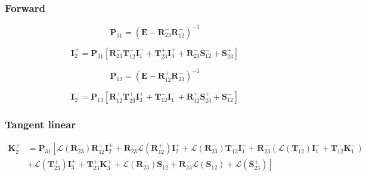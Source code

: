 \subsubsection{Forward}
\label{sec:radiance-internal_radiance-forward}

\begin{equation}
\mathbf{P}_{31} = (\mathbf{E} - \mathbf{R}^{-}_{23}\mathbf{R}^{+}_{12})^{-1}
\label{eq:radiance-internal_radiance-P31}
\end{equation}

\begin{equation}
\mathbf{I}^{+}_{2} = \mathbf{P}_{31} \left[\mathbf{R}^{-}_{23}\mathbf{T}^{-}_{12}\mathbf{I}^{-}_{1} + \mathbf{T}^{+}_{23}\mathbf{I}^{+}_{3} + \mathbf{R}^{-}_{23}\mathbf{S}^{-}_{12} + \mathbf{S}^{+}_{23}\right]
\label{eq:radiance-internal_radiance-I_p_2_0}
\end{equation}

\begin{equation}
\mathbf{P}_{13} = (\mathbf{E} - \mathbf{R}^{+}_{12}\mathbf{R}^{-}_{23})^{-1}
\label{eq:radiance-internal_radiance-P13}
\end{equation}

\begin{equation}
\mathbf{I}^{-}_{2} = \mathbf{P}_{13} \left[\mathbf{R}^{+}_{12}\mathbf{T}^{+}_{23}\mathbf{I}^{+}_{3} + \mathbf{T}^{-}_{12}\mathbf{I}^{-}_{1} + \mathbf{R}^{+}_{12}\mathbf{S}^{+}_{23} + \mathbf{S}^{-}_{12}\right]
\label{eq:radiance-internal_radiance-I_m_1_tau}
\end{equation}


%
\subsubsection{Tangent linear}
\label{sec:radiance-internal_radiance-tangent_linear}

\begin{equation}
	\begin{split}
		\mathbf{K}^{+}_{2} &= \mathbf{P}_{31}\left[\mathcal{L}(\mathbf{R}^{-}_{23})\mathbf{R}^{+}_{12}\mathbf{I}^{+}_{2} + \mathbf{R}^{-}_{23}\mathcal{L}(\mathbf{R}^{+}_{12})\mathbf{I}^{+}_{2} + \mathcal{L}(\mathbf{R}^{-}_{23})\mathbf{T}^{-}_{12}\mathbf{I}^{-}_{1} + \mathbf{R}^{-}_{23}(\mathcal{L}(\mathbf{T}^{-}_{12})\mathbf{I}^{-}_{1} + \mathbf{T}^{-}_{12}\mathbf{K}^{-}_{1}) \right. \\
		                   &+ \left.\mathcal{L}(\mathbf{T}^{+}_{23})\mathbf{I}^{+}_{3} + \mathbf{T}^{+}_{23}\mathbf{K}^{+}_{3} + \mathcal{L}(\mathbf{R}^{-}_{23})\mathbf{S}^{-}_{12} + \mathbf{R}^{-}_{23}\mathcal{L}(\mathbf{S}^{-}_{12}) + \mathcal{L}(\mathbf{S}^{+}_{23})\right]
	\end{split}
	\label{eq:radiance-internal_radiance-K_p_2_0}
\end{equation}

